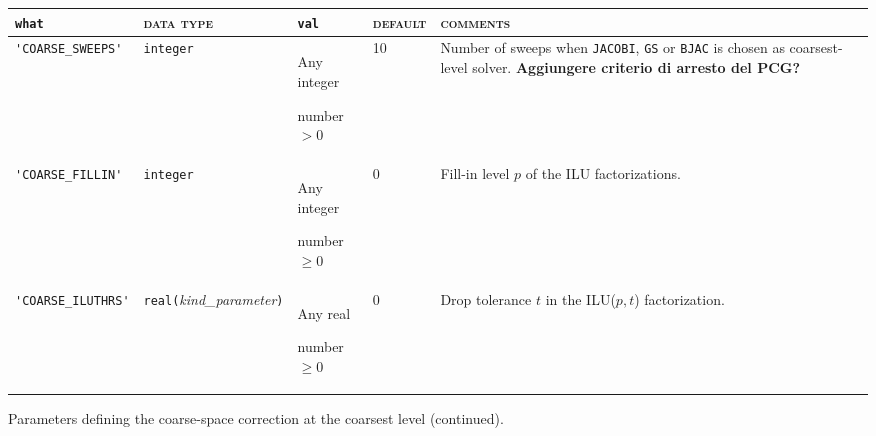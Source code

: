 \bsideways
\begin{center}
\begin{tabular}{|p{3.9cm}|l|p{2cm}|p{1.5cm}|p{7.5cm}|}
\hline
\verb|what|              & \textsc{data type}        &  \verb|val|      &  \textsc{default}  &
\textsc{comments} \\ \hline
\verb|'COARSE_SWEEPS'| & \verb|integer|
                         & Any integer \par number $> 0$
                         & 10
                         & Number of sweeps when \verb|JACOBI|, \verb|GS| or \verb|BJAC|
			   is chosen as coarsest-level solver. {\bf Aggiungere criterio di arresto del PCG?}\\ \hline
\verb|'COARSE_FILLIN'| & \verb|integer|
                         & Any integer \par number $\ge 0$
                         & 0
                         & Fill-in level $p$ of the ILU factorizations. \\ \hline
\verb|'COARSE_ILUTHRS'|
                         & \verb|real(|\emph{kind\_parameter}\verb|)|
                         & Any real \par number $\ge 0$
                         & 0
                         & Drop tolerance $t$ in the ILU($p,t$) factorization. \\
\hline
\end{tabular}
\end{center}
\caption{Parameters defining the coarse-space correction at the coarsest
level (continued).\label{tab:p_coarse_1}}
\esideways

